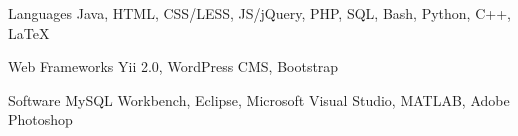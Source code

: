 


\begin{cvskills}


\cvskill
{Languages} %
{Java, HTML, CSS/LESS, JS/jQuery, PHP, SQL, Bash, Python, C++, LaTeX} %


\cvskill
{Web Frameworks} %
{Yii 2.0, WordPress CMS, Bootstrap} %


\cvskill
{Software} %
{MySQL Workbench, Eclipse, Microsoft Visual Studio, MATLAB, Adobe Photoshop} 


\end{cvskills}
